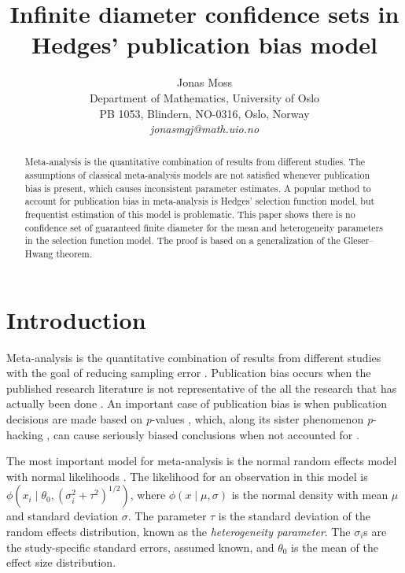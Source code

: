 \documentclass[twoside]{article}
\title{Infinite diameter confidence sets in Hedges' publication bias model}
\author{
  Jonas Moss \orcid{0000-0002-6876-6964} \\
  Department of Mathematics, University of Oslo\\
  PB 1053, Blindern, NO-0316, Oslo, Norway \\
  \it{jonasmgj@math.uio.no}
}
\begin{document}
\maketitle
\begin{abstract}
Meta-analysis is the quantitative combination of results from different studies. The assumptions of classical meta-analysis models are not satisfied whenever publication bias is present, which causes inconsistent parameter estimates. A popular method to account for publication bias in meta-analysis is Hedges' selection function model, but frequentist estimation of this model is problematic. This paper shows there is no confidence set of guaranteed finite diameter for the mean and heterogeneity parameters in the selection function model. The proof is based on a generalization of the Gleser--Hwang theorem.
\end{abstract}


\section{Introduction}
Meta-analysis is the quantitative combination of results from different studies with the goal of reducing sampling error \citep{lipsey2001practical}. 
Publication bias occurs when the published research literature is
not representative of the all the research that has actually been
done \citep{Rothstein2006-cq}. An important case of publication
bias is when publication decisions are made based on \textit{p}-values
\citep{sterling1959publication}, which, along its sister phenomenon \textit{p}-hacking \citep{simmons2011false},
can cause seriously biased conclusions when not accounted
for \citep{simmons2011false,moss2019modelling}.

The most important model for meta-analysis is the normal random effects
model with normal likelihoods \citep{hedges1998fixed}.
The likelihood for an observation in this model is $\phi(x_{i}\mid\theta_{0},(\sigma_{i}^{2}+\tau^{2})^{1/2})$,
where $\phi(x\mid\mu,\sigma)$ is the normal density with
mean $\mu$ and standard deviation $\sigma$. The parameter $\tau$ is the standard deviation of the random effects distribution, known as the \textit{heterogeneity parameter}. The $\sigma_i$s are the study-specific standard errors, assumed known, and $\theta_0$ is the mean of the effect size distribution. 
\end{document}
